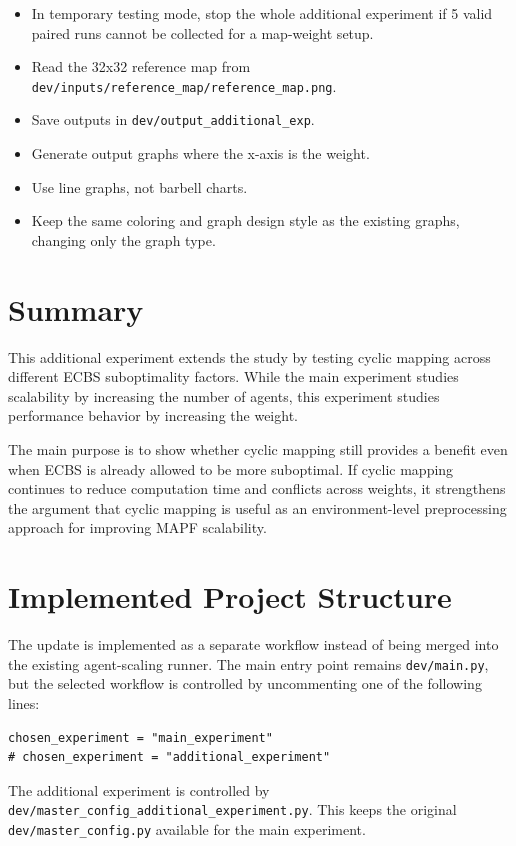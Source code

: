 \documentclass[11pt,a4paper]{article}
\begin{document}
\begin{itemize}[leftmargin=2em]
    \item In temporary testing mode, stop the whole additional experiment if 5 valid paired runs cannot be collected for a map-weight setup.
    \item Read the 32x32 reference map from \texttt{dev/inputs/reference\_map/reference\_map.png}.
    \item Save outputs in \texttt{dev/output\_additional\_exp}.
    \item Generate output graphs where the x-axis is the weight.
    \item Use line graphs, not barbell charts.
    \item Keep the same coloring and graph design style as the existing graphs, changing only the graph type.
\end{itemize}

\section*{Summary}

This additional experiment extends the study by testing cyclic mapping across different ECBS suboptimality factors. While the main experiment studies scalability by increasing the number of agents, this experiment studies performance behavior by increasing the weight.

The main purpose is to show whether cyclic mapping still provides a benefit even when ECBS is already allowed to be more suboptimal. If cyclic mapping continues to reduce computation time and conflicts across weights, it strengthens the argument that cyclic mapping is useful as an environment-level preprocessing approach for improving MAPF scalability.



\section*{Implemented Project Structure}

The update is implemented as a separate workflow instead of being merged into the existing agent-scaling runner. The main entry point remains \texttt{dev/main.py}, but the selected workflow is controlled by uncommenting one of the following lines:

\begin{verbatim}
chosen_experiment = "main_experiment"
# chosen_experiment = "additional_experiment"
\end{verbatim}

The additional experiment is controlled by \texttt{dev/master\_config\_additional\_experiment.py}. This keeps the original \texttt{dev/master\_config.py} available for the main experiment.
\end{document}
